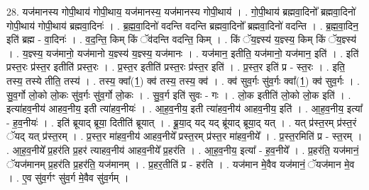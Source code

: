 \documentclass[17pt]{extarticle}
\begin{document}
28. यज॑मानस्य गोपी॒थाय॑ गोपी॒थाय॒ यज॑मानस्य॒ यज॑मानस्य गोपी॒थाय॑ । . गो॒पी॒थाय॑ ब्रह्मवा॒दिनो᳚ ब्रह्मवा॒दिनो॑ गोपी॒थाय॑ गोपी॒थाय॑ ब्रह्मवा॒दिनः॑ । . ब्र॒ह्म॒वा॒दिनो॑ वदन्ति वदन्ति ब्रह्मवा॒दिनो᳚ ब्रह्मवा॒दिनो॑ वदन्ति । . ब्र॒ह्म॒वा॒दिन॒ इति॑ ब्रह्म - वा॒दिनः॑ । . व॒द॒न्ति॒ किम् किं ॅव॑दन्ति वदन्ति॒ किम् । . किं ॅय॒ज्ञ्स्य॑ य॒ज्ञ्स्य॒ किम् किं ॅय॒ज्ञ्स्य॑ । . य॒ज्ञ्स्य॒ यज॑मानो॒ यज॑मानो य॒ज्ञ्स्य॑ य॒ज्ञ्स्य॒ यज॑मानः । . यज॑मान॒ इतीति॒ यज॑मानो॒ यज॑मान॒ इति॑ । . इति॑ प्रस्त॒रः प्र॑स्त॒र इतीति॑ प्रस्त॒रः । . प्र॒स्त॒र इतीति॑ प्रस्त॒रः प्र॑स्त॒र इति॑ । . प्र॒स्त॒र इति॑ प्र - स्त॒रः । . इति॒ तस्य॒ तस्ये तीति॒ तस्य॑ । . तस्य॒ क्वा᳚(1॒) क्व॑ तस्य॒ तस्य॒ क्व॑ । . क्व॑ सुव॒र्गः सु॑व॒र्गः क्वा᳚(1॒) क्व॑ सुव॒र्गः । . सु॒व॒र्गो लो॒को लो॒कः सु॑व॒र्गः सु॑व॒र्गो लो॒कः । . सु॒व॒र्ग इति॑ सुवः - गः । . लो॒क इतीति॑ लो॒को लो॒क इति॑ । . इत्या॑हव॒नीय॑ आहव॒नीय॒ इती त्या॑हव॒नीयः॑ । . आ॒ह॒व॒नीय॒ इती त्या॑हव॒नीय॑ आहव॒नीय॒ इति॑ । . आ॒ह॒व॒नीय॒ इत्या᳚ - ह॒व॒नीयः॑ । . इति॑ ब्रूयाद् ब्रूया॒ दितीति॑ ब्रूयात् । . ब्रू॒या॒द् यद् यद् ब्रू॑याद् ब्रूया॒द् यत् । . यत् प्र॑स्त॒रम् प्र॑स्त॒रं ॅयद् यत् प्र॑स्त॒रम् । . प्र॒स्त॒र मा॑हव॒नीय॑ आहव॒नीये᳚ प्रस्त॒रम् प्र॑स्त॒र मा॑हव॒नीये᳚ । . प्र॒स्त॒रमिति॑ प्र - स्त॒रम् । . आ॒ह॒व॒नीये᳚ प्र॒हर॑ति प्र॒हर॑ त्याहव॒नीय॑ आहव॒नीये᳚ प्र॒हर॑ति । . आ॒ह॒व॒नीय॒ इत्या᳚ - ह॒व॒नीये᳚ । . प्र॒हर॑ति॒ यज॑मानं॒ ॅयज॑मानम् प्र॒हर॑ति प्र॒हर॑ति॒ यज॑मानम् । . प्र॒हर॒तीति॑ प्र - हर॑ति । . यज॑मान मे॒वैव यज॑मानं॒ ॅयज॑मान मे॒व । . ए॒व सु॑व॒र्गꣳ सु॑व॒र्ग मे॒वैव सु॑व॒र्गम् । \newline
\end{document}
